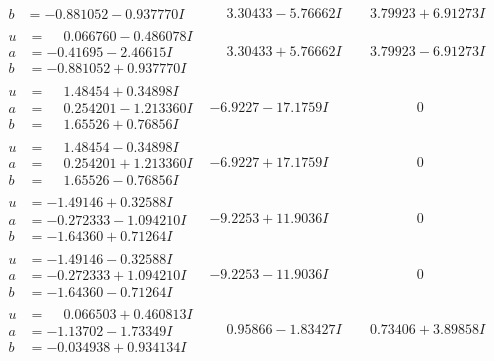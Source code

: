 \documentclass[1p]{elsarticle_modified}
\theoremstyle{definition}
\begin{document}
$$\begin{array}{c|c|c}
\begin{aligned}
b &= -0.881052 - 0.937770 I\end{aligned}
 & \phantom{-}3.30433 - 5.76662 I & \phantom{-}3.79923 + 6.91273 I \\ \hline\begin{aligned}
u &= \phantom{-}0.066760 - 0.486078 I \\
a &= -0.41695 - 2.46615 I \\
b &= -0.881052 + 0.937770 I\end{aligned}
 & \phantom{-}3.30433 + 5.76662 I & \phantom{-}3.79923 - 6.91273 I \\ \hline\begin{aligned}
u &= \phantom{-}1.48454 + 0.34898 I \\
a &= \phantom{-}0.254201 - 1.213360 I \\
b &= \phantom{-}1.65526 + 0.76856 I\end{aligned}
 & -6.9227 - 17.1759 I & \phantom{-0.000000 } 0 \\ \hline\begin{aligned}
u &= \phantom{-}1.48454 - 0.34898 I \\
a &= \phantom{-}0.254201 + 1.213360 I \\
b &= \phantom{-}1.65526 - 0.76856 I\end{aligned}
 & -6.9227 + 17.1759 I & \phantom{-0.000000 } 0 \\ \hline\begin{aligned}
u &= -1.49146 + 0.32588 I \\
a &= -0.272333 - 1.094210 I \\
b &= -1.64360 + 0.71264 I\end{aligned}
 & -9.2253 + 11.9036 I & \phantom{-0.000000 } 0 \\ \hline\begin{aligned}
u &= -1.49146 - 0.32588 I \\
a &= -0.272333 + 1.094210 I \\
b &= -1.64360 - 0.71264 I\end{aligned}
 & -9.2253 - 11.9036 I & \phantom{-0.000000 } 0 \\ \hline\begin{aligned}
u &= \phantom{-}0.066503 + 0.460813 I \\
a &= -1.13702 - 1.73349 I \\
b &= -0.034938 + 0.934134 I\end{aligned}
 & \phantom{-}0.95866 - 1.83427 I & \phantom{-}0.73406 + 3.89858 I \\ \hline\begin{aligned}

\end{aligned}
\end{array}$$
\end{document}
